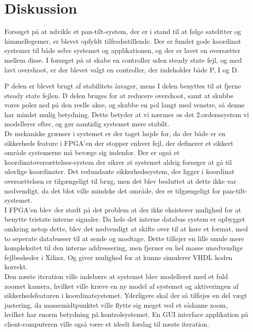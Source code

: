 \section{Diskussion}
Forsøget på at udvikle et pan-tilt-system, der er i stand til at følge satelitter og himmellegemer, er blevet opfyldt tilfredsstillende. Der er fundet gode koordinat systemer til både selve systemet og applikationen, og der er lavet en oversætter mellem disse. I forsøget på at skabe en controller uden steady state fejl, og med lavt overshoot, er der blevet valgt en controller, der indeholder både P, I og D.

P delen er blevet brugt af stabilitets årsager, mens I delen benyttes til at fjerne steady state fejlen. D delen bruges for at reducere overshoot, samt at skubbe vores poler ned på den reelle akse, og skubbe en pol langt med venstre, så denne har mindst mulig betydning. Dette betyder at vi nærmer os det 2.ordenssystem vi modellerer efter, og gør samtidig systemet mere stabilt.
\\
De mekaniske grænser i systemet er der taget højde for, da der både er en sikkerheds feature i FPGA'en der stopper enhver fejl, der definerer et sikkert område systemerne må bevæge sig indenfor. Der er også et koordinatoversættelses-system der sikrer at systemet aldrig forsøger at gå til ulovlige koordinater. Det redundante sikkerhedssystem, der ligger i koordinat oversættelsen er tilgængeligt til brug, men det blev besluttet at dette ikke var nødvendigt, da det blot ville mindske det område, der er tilgængeligt for pan-tilt-systemet.
\\
I FPGA'en blev der stødt på det problem at der ikke eksisterer mulighed for at benytte tristate interne signaler. Da hele det interne databus system er opbygget omkring netop dette, blev det nødvendigt at skifte over til at køre et format, med to seperate databusser til at sende og modtage. Dette tilføjer en lille smule mere kompleksitet til den interne addressering, men fjerner en hel masse unødvendige fejlbeskeder i Xilinx. Og giver mulighed for at kunne simulerer VHDL koden korrekt.
\\
Den næste iteration ville indebære at systemet blev modelleret med et fuld zoomet kamera, hvilket ville kræve en ny model af systemet og aktiveringen af sikkerhedsfeaturen i koordinatsystemet. Yderligere skal der så tilføjes en del vægt justering, da massemidtpunktet ville flytte sig meget ved et sådanne zoom, hvilket har enorm betydning på kontrolsystemet. En GUI interface applikation på client-computeren ville også være et ideelt forslag til næste iteration.
